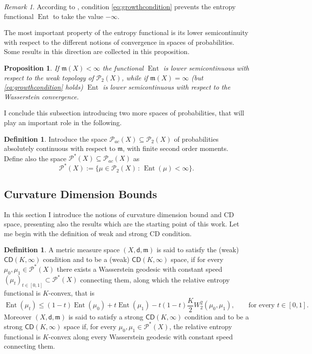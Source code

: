 \documentclass[11pt,twoside,a4paper]{article}
\newcommand{\suchthat}{\ensuremath{\,:\,}} %
\newcommand{\CD}{\mathsf{CD}}
\newcommand{\di}{\mathsf d} %
\newcommand{\m}{\mathfrak m} %
\DeclareMathOperator{\Ent}{Ent}
\newcommand{\Prob}{\mathscr{P}}
\newcommand{\ProbTwo}{\mathscr{P}_2}
\theoremstyle{theorem}
\newtheorem{prop}[theorem]{Proposition}
\theoremstyle{definition}
\newtheorem{definition}[theorem]{Definition}
\theoremstyle{remark}
\newtheorem{remark}[theorem]{Remark}
\theoremstyle{proof}
\begin{document}
\begin{remark}
According to \cite{Ambrosio_2015}, condition \eqref{eq:growthcondition} prevents the entropy functional $\Ent$ to take the value $-\infty$.
\end{remark}

\noindent The most important property of the entropy functional is its lower semicontinuity with respect to the different notions of convergence in spaces of probabilities. Some results in this direction are collected in this proposition.

\begin{prop}\label{prop:lscofent}
 If $\m(X)<\infty$ the functional $\Ent$ is lower semicontinuous with respect to the weak topology of $\ProbTwo(X)$, while if $\m(X)=\infty$ (but \eqref{eq:growthcondition} holds) $\Ent$ is lower semicontinuous with respect to the Wasserstein convergence.
\end{prop}



I conclude this subsection introducing two more spaces of probabilities, that will play an important role in the following. 

\begin{definition}
Introduce the space $\Prob_{ac}(X)\subseteq\ProbTwo(X)$ of probabilities absolutely continuous with respect to $\m$, with finite second order moments. Define also the space $\Prob^*(X)\subseteq\Prob_{ac}(X)$ as 
\begin{equation*}
    \Prob^*(X) := \{\mu\in\ProbTwo(X)\suchthat\Ent(\mu)<\infty\}.
\end{equation*}
\end{definition}




\subsection{Curvature Dimension Bounds}


In this section I introduce the notions of curvature dimension bound and CD space, presenting also the results which are the starting point of this work. Let me begin with the definition of weak and strong CD condition.


\begin{definition}\label{def:cdinfty}
A metric measure space $(X,\di,\m)$ is said to satisfy the (weak) $\CD(K,\infty)$ condition and to be a (weak) $\CD(K,\infty)$ space, if for every $\mu_0,\mu_1\in\Prob^*(X)$ there exists a Wasserstein geodesic with constant speed $(\mu_t)_{t\in[0,1]}\subset\Prob^*(X)$ connecting them, along which the relative entropy functional is $K$-convex, that is 
\begin{equation*}
    \Ent(\mu_t) \leq (1-t) \Ent(\mu_0) + t\Ent(\mu_1) -t(1-t)\frac K2  W_2^2(\mu_0,\mu_1), \qquad \text{for every }t\in [0,1].
\end{equation*}
Moreover $(X,\mathsf{d},\mathfrak{m})$ is said to satisfy a strong $\CD(K,\infty)$ condition and to be a strong $\CD(K,\infty)$ space if, for every $\mu_0,\mu_1\in\Prob^*(X)$, the relative entropy functional is $K$-convex along every Wasserstein geodesic with constant speed connecting them. 
\end{definition}
\end{document}
